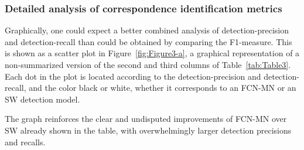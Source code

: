 \documentclass[a4paper,authoryear,review]{elsarticle}
\begin{document}
	
	
	\subsubsection{Detailed analysis of correspondence identification metrics}
	\label{sub:compFCNSW}
	
	Graphically, one could expect a better combined analysis of detection-precision and detection-recall than could be obtained by comparing the F1-measure. This is shown as a scatter plot in Figure~\ref{fig:Figure3-a}, a graphical representation of a non-summarized version of the second and third columns of Table~\ref{tab:Table3}. Each dot in the plot is located according to the detection-precision and detection-recall, and the color black or white, whether it corresponds to an FCN-MN or an SW detection model.
	
	The graph reinforces the clear and undisputed improvements of FCN-MN over SW already shown in the table, with overwhelmingly larger detection precisions and recalls. 
	
\end{document}
